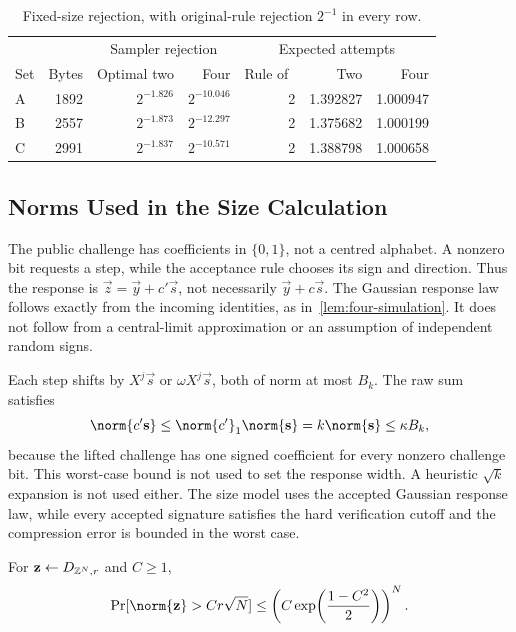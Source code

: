 \begin{table}[!htbp]
\centering
\begin{tabular}{lrrrrrr}
\toprule
& & \multicolumn{2}{c}{Sampler rejection} & \multicolumn{3}{c}{Expected attempts}\\
Set & Bytes & Optimal two & Four & Rule of~\cite{GartnerFull} & Two & Four\\
\midrule
A & 1892 & $2^{-1.826}$ & $2^{-10.046}$ & 2 & 1.392827 & 1.000947\\
B & 2557 & $2^{-1.873}$ & $2^{-12.297}$ & 2 & 1.375682 & 1.000199\\
C & 2991 & $2^{-1.837}$ & $2^{-10.571}$ & 2 & 1.388798 & 1.000658\\
\bottomrule
\end{tabular}
\caption{Fixed-size rejection, with original-rule rejection $2^{-1}$ in every row.}
\label{tab:four-fixed-width}
\end{table}

\subsection{Norms Used in the Size Calculation}

The public challenge has coefficients in $\{0,1\}$, not a centred alphabet. A nonzero bit requests a step, while the acceptance rule chooses its sign and direction. Thus the response is $\vec z=\vec y+c'\vec s$, not necessarily $\vec y+c\vec s$. The Gaussian response law follows exactly from the incoming identities, as in~\cref{lem:four-simulation}. It does not follow from a central-limit approximation or an assumption of independent random signs.

Each step shifts by $X^j\vec s$ or $\omega X^j\vec s$, both of norm at most $B_k$. The raw sum satisfies
\[
 \norm{c'\vec s}\le\norm{c'}_1\norm{\vec s}
 =k\norm{\vec s}\le\kappa B_k,
\]
because the lifted challenge has one signed coefficient for every nonzero challenge bit. This worst-case bound is not used to set the response width. A heuristic $\sqrt{k}$ expansion is not used either. The size model uses the accepted Gaussian response law, while every accepted signature satisfies the hard verification cutoff and the compression error is bounded in the worst case.

\begin{lemma}
\label{lem:multi-norm-tail}
For $\mathbf{z}\leftarrow D_{\mathbb{Z}^N,r}$ and $C\ge1$,
\[
 \Pr[\norm{\vec z}>Cr\sqrt N]\le
 \left(C\exp\!\left(\frac{1-C^2}{2}\right)\right)^N.
\]
\end{lemma}

